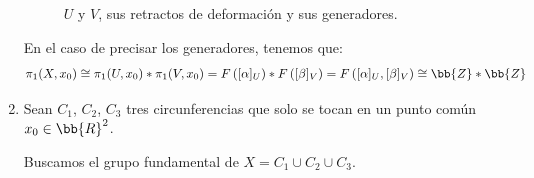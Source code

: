 \begin{ejemplo}
\begin{enumerate}
\begin{figure}[ht]
\begin{tikzpicture}[>=stealth]
            \end{tikzpicture}
            \caption{$U$ y $V$, sus retractos de deformación y sus generadores.}
            \label{fig:dos_circunferencias_generadores}
        \end{figure}

        En el caso de precisar los generadores, tenemos que:
        \begin{gather*}
            \pi_1(X,x_0) \cong \pi_1(U,x_0) \ast \pi_1(V,x_0) = F\left([\alpha]_U\right) \ast F\left([\beta]_V\right) = F\left([\alpha]_U, [\beta]_V\right) \cong \bb{Z} \ast \bb{Z}
        \end{gather*}



        \item Sean $C_1$, $C_2$, $C_3$ tres circunferencias que solo se tocan en un punto común $x_0\in \bb{R}^2$.
        
        Buscamos el grupo fundamental de $X=C_1\cup C_2\cup C_3$.
        \begin{figure}[ht]
            \centering
        \end{figure}


\end{enumerate}
\end{ejemplo}
